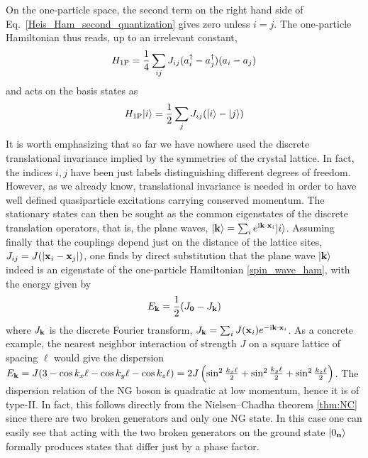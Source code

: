 \documentclass[final,2p,times,12pt,sort&compress]{elsarticle}
\newcommand\vek[1]{{\boldsymbol{\bf #1}}}   %
\newcommand\skal[2]{\vek{#1}\cdot\vek{#2}}  %
\newcommand\ket[1]{\vert#1\rangle}          %
\newcommand\he[1]{#1^{\dagger}}             %
\newcommand\imag{\mathrm i}                 %
\newcommand\abs[1]{\left|#1\right|}         %
\begin{document}
On the one-particle space, the second term on the right hand side of
Eq.~\eqref{Heis_Ham_second_quantization} gives zero unless $i=j$. The
one-particle Hamiltonian thus reads, up to an irrelevant constant,
\begin{equation}
H_{1\text P}=\frac14\sum_{ij}J_{ij}(\he a_i-\he a_j)(a_i-a_j)
\end{equation}
and acts on the basis states as
\begin{equation}
H_{1\text P}\ket i=\frac12\sum_jJ_{ij}(\ket i-\ket j)
\label{spin_wave_ham}
\end{equation}
It is worth emphasizing that so far we have nowhere used the discrete
translational invariance implied by the symmetries of the crystal lattice. In
fact, the indices $i,j$ have been just labels distinguishing different degrees
of freedom. However, as we already know, translational invariance is needed in
order to have well defined quasiparticle excitations carrying conserved
momentum. The stationary states can then be sought as the common eigenstates of
the discrete translation operators, that is, the plane waves, $\ket{\vek
k}=\sum_i e^{\imag\skal kx_i}\ket i$. Assuming finally that the couplings
depend just on the distance of the lattice sites, $J_{ij}=J(\abs{\vek x_i-\vek
x_j})$, one finds by direct substitution that the plane wave $\ket{\vek k}$
indeed is an eigenstate of the one-particle Hamiltonian \eqref{spin_wave_ham},
with the energy given by
\begin{equation}
E_{\vek k}=\frac12(J_{\vek0}-J_{\vek k})
\label{E_magnon}
\end{equation}
where $J_{\vek k}$ is the discrete Fourier transform, $J_{\vek k}=\sum_i J(\vek
x_i)e^{-\imag\skal kx_i}$. As a concrete example, the nearest neighbor
interaction of strength $J$ on a square lattice of spacing $\ell$ would give
the dispersion $E_{\vek k}=J(3-\cos k_x\ell-\cos k_y\ell-\cos k_z\ell)=
2J\left(\sin^2\frac{k_x\ell}2+\sin^2\frac{k_y\ell}2+\sin^2\frac{k_z\ell}2\right)$.
The dispersion relation of the NG boson is quadratic at low momentum, hence it
is of type-II. In fact, this follows directly from the Nielsen--Chadha theorem
\ref{thm:NC} since there are two broken generators and only one NG state. In
this case one can easily see that acting with the two broken generators on the
ground state $\ket{0_{\vek n}}$ formally produces states that differ just by a
phase factor.
\end{document}
